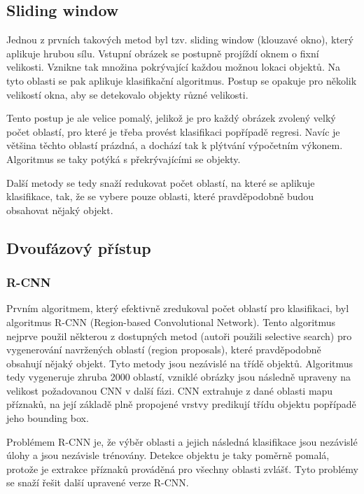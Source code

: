 \subsection{Sliding window}

Jednou z prvních takových metod byl tzv. sliding window (klouzavé okno), který
aplikuje hrubou sílu. Vstupní obrázek se postupně projíždí oknem o fixní
velikosti. Vznikne tak množina pokrývající každou možnou lokaci objektů. Na
tyto oblasti se pak aplikuje klasifikační algoritmus. Postup se opakuje pro
několik velikostí okna, aby se detekovalo objekty různé velikosti.

Tento postup je ale velice pomalý, jelikož je pro každý obrázek zvolený velký
počet oblastí, pro které je třeba provést klasifikaci popřípadě regresi. Navíc
je většina těchto oblastí prázdná, a dochází tak k plýtvání výpočetním výkonem.
Algoritmus se taky potýká s překrývajícími se objekty.

Další metody se tedy snaží redukovat počet oblastí, na které se aplikuje
klasifikace, tak, že se vybere pouze oblasti, které pravděpodobně budou
obsahovat nějaký objekt.

\subsection{Dvoufázový přístup}

\subsubsection{R-CNN}
Prvním algoritmem, který efektivně zredukoval počet oblastí pro klasifikaci,
byl algoritmus R-CNN (Region-based Convolutional Network). \cite{r-cnn} Tento
algoritmus nejprve použil některou z dostupných metod (autoři použili selective
search) pro vygenerování navržených oblastí (region proposals), které
pravděpodobně obsahují nějaký objekt. Tyto metody jsou nezávislé na třídě
objektů. Algoritmus tedy vygeneruje zhruba 2000 oblastí, vzniklé obrázky jsou
následně upraveny na velikost požadovanou CNN v další fázi. CNN extrahuje z  
dané oblasti mapu příznaků, na její základě plně propojené vrstvy predikují
třídu objektu popřípadě jeho bounding box.

Problémem R-CNN je, že výběr oblasti a jejich následná klasifikace jsou
nezávislé úlohy a jsou nezávisle trénovány. Detekce objektu je taky poměrně
pomalá, protože je extrakce příznaků prováděná pro všechny oblasti zvlášť. Tyto
problémy se snaží řešit další upravené verze R-CNN.

